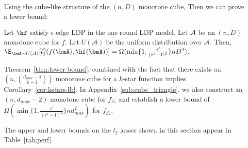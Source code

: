 Using 
the cube-like structure of the $(n,D)$ monotone cube, 
Then 
we can prove a lower
bound:
\begin{theorem}\label{thm:lower-bound}
  Let $\hf$ satisfy 
  $\epsilon$-edge LDP
  in the one-round 
  LDP
  model. Let $\cal{A}$ be an $(n,D)$ monotone cube for $f$. 
  Let $U(\mathcal{A})$ be the uniform distribution over $\mathcal{A}$. 
  Then,
  $\E_{\bmA \sim U(\mathcal{A})}[l_2^2(f(\bmA), \hf(\bmA))] =
  \Omega(\min\{1, \frac{e^\epsilon}{(e^\epsilon-1)^2}\}nD^2)$.
\end{theorem}


Theorem~\ref{thm:lower-bound}, combined with the fact that there exists an
$(n,\binom{d_{max}-4}{k-1})$ 
monotone cube for 
a $k$-star function 
implies Corollary~\ref{cor:kstars-lb}. 
In Appendix~\ref{sub:cube_triangle}, we also construct an $(n, d_{max}-2)$ monotone cube for
$f_\triangle$ and establish a lower bound of 
$\Omega(\min\{1, \frac{e^\epsilon}{(e^\epsilon-1)^2}\} nd_{max}^2)$ for
$f_\triangle$. 

The upper and lower bounds on the $l_2$ losses 
shown in
this section appear in Table~\ref{tab:perf}.
